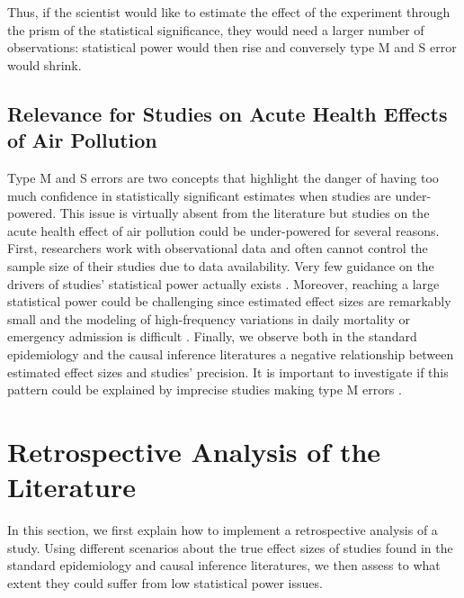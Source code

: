 \documentclass[12pt]{article}
\begin{document}
    Thus, if the scientist would like to estimate the effect of the experiment through the prism of the statistical significance, they would need a larger number of observations:  statistical power would then rise and conversely type M and S error would shrink.
    
\subsection{Relevance for Studies on Acute Health Effects of Air Pollution}

    Type M and S errors are two concepts that highlight the danger of having too much confidence in statistically significant estimates when studies are under-powered. This issue is virtually absent from the literature but studies on the acute health effect of air pollution could be under-powered for several reasons. First, researchers work with observational data and often cannot control the sample size of their studies due to data availability. Very few guidance on the drivers of studies' statistical power actually exists \citep{winquist2012power, bhaskaran2013time}. Moreover, reaching a large statistical power could be challenging since estimated effect sizes are remarkably small and the modeling of high-frequency variations in daily mortality or emergency admission is difficult \citep{peng2006model, peng2008statistical}. Finally, we observe both in the standard epidemiology and the causal inference literatures a negative relationship between estimated effect sizes and studies' precision. It is important to investigate if this pattern could be explained by imprecise studies making type M errors \citep{ioannidis2008most, gelman_beyond_2014, ioannidis_power_2017, ferraro_featureis_2020}.
    



\section{Retrospective Analysis of the Literature}
    
    In this section, we first explain how to implement a retrospective analysis of a study. Using different scenarios about the true effect sizes of studies found in the standard epidemiology and causal inference literatures, we then assess to what extent they could suffer from low statistical power issues.
    
\end{document}
